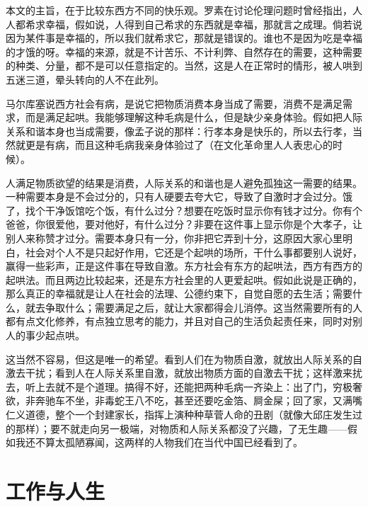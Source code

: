 本文的主旨，在于比较东西方不同的快乐观。罗素在讨论伦理问题时曾经指出，人人都希求幸福，假如说，人得到自己希求的东西就是幸福，那就言之成理。倘若说因为某件事是幸福的，所以我们就希求它，那就是错误的。谁也不是因为吃是幸福的才饿的呀。幸福的来源，就是不计苦乐、不计利弊、自然存在的需要，这种需要的种类、分量，都不是可以任意指定的。当然，这是人在正常时的情形，被人哄到五迷三道，晕头转向的人不在此列。 

马尔库塞说西方社会有病，是说它把物质消费本身当成了需要，消费不是满足需求，而是满足起哄。我能够理解这种毛病是什么，但是缺少亲身体验。假如把人际关系和谐本身也当成需要，像孟子说的那样：行孝本身是快乐的，所以去行孝，当然就更是有病，而且这种毛病我亲身体验过了（在文化革命里人人表忠心的时候）。 

人满足物质欲望的结果是消费，人际关系的和谐也是人避免孤独这一需要的结果。一种需要本身是不会过分的，只有人硬要去夸大它，导致了自激时才会过分。饿了，找个干净饭馆吃个饭，有什么过分？想要在吃饭时显示你有钱才过分。你有个爸爸，你很爱他，要对他好，有什么过分？非要在这件事上显示你是个大孝子，让别人来称赞才过分。需要本身只有一分，你非把它弄到十分，这原因大家心里明白，社会对个人不是只起好作用，它还是个起哄的场所，干什么事都要别人说好，赢得一些彩声，正是这件事在导致自激。东方社会有东方的起哄法，西方有西方的起哄法。而且两边比较起来，还是东方社会里的人更爱起哄。假如此说是正确的，那么真正的幸福就是让人在社会的法理、公德约束下，自觉自愿的去生活；需要什么，就去争取什么；需要满足之后，就让大家都得会儿消停。这当然需要所有的人都有点文化修养，有点独立思考的能力，并且对自己的生活负起责任来，同时对别人的事少起点哄。 

这当然不容易，但这是唯一的希望。看到人们在为物质自激，就放出人际关系的自激去干扰；看到人在人际关系里自激，就放出物质方面的自激去干扰；这样激来扰去，听上去就不是个道理。搞得不好，还能把两种毛病一齐染上：出了门，穷极奢欲，非奔驰车不坐，非毒蛇王八不吃，甚至还要吃金箔、屙金屎；回了家，又满嘴仁义道德，整个一个封建家长，指挥上演种种草菅人命的丑剧（就像大邱庄发生过的那样）；要不就走向另一极端，对物质和人际关系都没了兴趣，了无生趣——假如我还不算太孤陋寡闻，这两样的人物我们在当代中国已经看到了。

\chapter{工作与人生}

